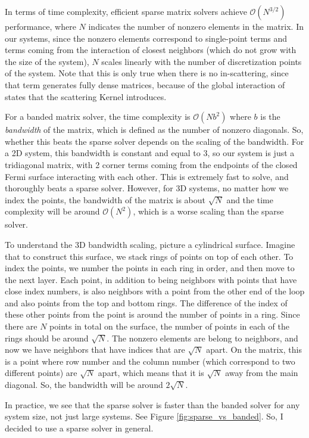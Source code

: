\documentclass[12pt]{article}
\begin{document}
In terms of time complexity, efficient sparse matrix solvers achieve
$\mathcal{O}(N^{3/2})$ performance, where $N$ indicates the number of nonzero elements in the
matrix. In our systems, since the nonzero elements correspond to single-point terms and terms
coming from the interaction of closest neighbors (which do not grow with the size of the system),
$N$ scales linearly with the number of discretization points of the system. Note that this is only
true when there is no in-scattering, since that term generates fully dense matrices, because of
the global interaction of states that the scattering Kernel introduces.

For a banded matrix solver, the time complexity is $\mathcal{O}(Nb^2)$ where $b$ is the
\emph{bandwidth} of the matrix, which is defined as the number of nonzero diagonals. So, whether
this beats the sparse solver depends on the scaling of the bandwidth. For a 2D system, this
bandwidth is constant and equal to 3, so our system is just a tridiagonal matrix, with 2 corner
terms coming from the endpoints of the closed Fermi surface interacting with each other. This
is extremely fast to solve, and thoroughly beats a sparse solver. However, for 3D systems, no
matter how we index the points, the bandwidth of the matrix is about $\sqrt{N}$ and the time
complexity will be around $\mathcal{O}(N^2)$, which is a worse scaling than the sparse solver.

To understand the 3D bandwidth scaling, picture a cylindrical surface. Imagine that to construct
this surface, we stack rings of points on top of each other. To index the points, we number the
points in each ring in order, and then move to the next layer. Each point, in addition to being
neighbors with points that have close index numbers, is also neighbors with a point from the
other end of the loop and also points from the top and bottom rings. The difference of the index
of these other points from the point is around the number of points in a ring. Since there are
$N$ points in total on the surface, the number of points in each of the rings should be around
$\sqrt{N}$. The nonzero elements are belong to neighbors, and now we have neighbors that have
indices that are $\sqrt{N}$ apart. On the matrix, this is a point where row number and the column
number (which correspond to two different points) are $\sqrt{N}$ apart, which means that it is
$\sqrt{N}$ away from the main diagonal. So, the bandwidth will be around $2\sqrt{N}$.

In practice, we see that the sparse solver is faster than the banded solver for any system size,
not just large systems. See Figure \ref{fig:sparse_vs_banded}. So, I decided to use a sparse
solver in general.
\end{document}
